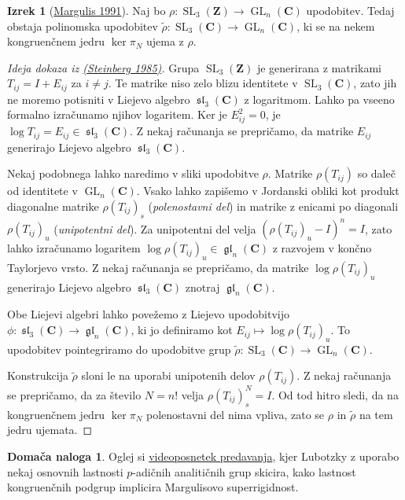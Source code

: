 \documentclass[11pt]{book}
\def\ZZ{\mathbf{Z}}
\def\CC{\mathbf{C}}
\DeclareMathOperator\GL{GL}
\DeclareMathOperator\glfrak{\mathfrak{gl}}
\DeclareMathOperator\slfrak{\mathfrak{sl}}
\DeclareMathOperator\SL{SL}
\theoremstyle{definition}
\theoremstyle{zgled}
\theoremstyle{odprtproblem}
\theoremstyle{domacanaloga}
\newtheorem*{domacanaloga}{Domača naloga}
\newenvironment{dokaz}
    {\color{siva}\begin{proof}}
    {\end{proof}}
\theoremstyle{izrek}
\newtheorem*{izrek}{Izrek}
\begin{document}
\begin{izrek}[\href{https://link.springer.com/book/9783642057212}{Margulis 1991}]
Naj bo $\rho \colon \SL_3(\ZZ) \to \GL_n(\CC)$ upodobitev. Tedaj obstaja polinomska upodobitev $\tilde \rho \colon \SL_3(\CC) \to \GL_n(\CC)$, ki se na nekem kongruenčnem jedru $\ker \pi_{N}$ ujema z $\rho$.
\end{izrek}
\begin{dokaz}[Ideja dokaza iz \href{https://zbmath.org/?q=an:0579.20038}{(Steinberg 1985)}]
Grupa $\SL_3(\ZZ)$ je generirana z matrikami $T_{ij} = I + E_{ij}$ za $i \neq j$. Te matrike niso zelo blizu identitete v $\SL_3(\CC)$, zato jih ne moremo potisniti v Liejevo algebro $\slfrak_3(\CC)$ z logaritmom. Lahko pa vseeno formalno izračunamo njihov logaritem. Ker je $E_{ij}^2 = 0$, je $\log T_{ij} = E_{ij} \in \slfrak_3(\CC)$. Z nekaj računanja se prepričamo, da matrike $E_{ij}$ generirajo  Liejevo algebro $\slfrak_3(\CC)$.

Nekaj podobnega lahko naredimo v sliki upodobitve $\rho$. Matrike $\rho(T_{ij})$ so daleč od identitete v $\GL_n(\CC)$. Vsako lahko zapišemo v Jordanski obliki kot produkt diagonalne matrike $\rho(T_{ij})_s$ (\emph{polenostavni del}) in matrike z enicami po diagonali $\rho(T_{ij})_u$ (\emph{unipotentni del}). Za unipotentni del velja $(\rho(T_{ij})_u - I)^n = I$, zato lahko izračunamo logaritem $\log \rho(T_{ij})_u \in \glfrak_n(\CC)$ z razvojem v končno Taylorjevo vrsto. Z nekaj računanja se prepričamo, da matrike $\log \rho(T_{ij})_u$ generirajo Liejevo algebro $\slfrak_3(\CC)$ znotraj $\glfrak_n(\CC)$. 

Obe Liejevi algebri lahko povežemo z Liejevo upodobitvijo $\phi \colon \slfrak_3(\CC) \to \glfrak_n(\CC)$, ki jo definiramo kot $E_{ij} \mapsto \log \rho(T_{ij})_u$. To upodobitev pointegriramo do upodobitve grup $\tilde \rho \colon \SL_3(\CC) \to \GL_n(\CC)$. 

Konstrukcija $\tilde \rho$ sloni le na uporabi unipotenih delov $\rho(T_{ij})$. Z nekaj računanja se prepričamo, da za število $N = n!$ velja $\rho(T_{ij})_s^N = I$. Od tod hitro sledi, da na kongruenčnem jedru $\ker \pi_N$ polenostavni del nima vpliva, zato se $\rho$ in $\tilde \rho$ na tem jedru ujemata.
\end{dokaz}

\begin{domacanaloga}
Oglej si \href{http://www.fields.utoronto.ca/talks/congruence-subgroup-problem-and-boundedness-conditions}{videoposnetek predavanja}, kjer Lubotzky z uporabo nekaj osnovnih lastnosti $p$-adičnih analitičnih grup skicira, kako lastnost kongruenčnih podgrup implicira Margulisovo superrigidnost.
\end{domacanaloga}
\end{document}
